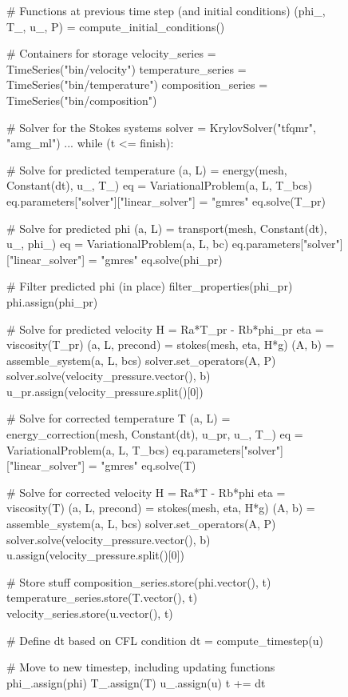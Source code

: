 \begin{figure}
  \begin{center}
    \begin{python}
# Functions at previous time step (and initial conditions)
(phi_, T_, u_, P) = compute_initial_conditions()

# Containers for storage
velocity_series = TimeSeries("bin/velocity")
temperature_series = TimeSeries("bin/temperature")
composition_series = TimeSeries("bin/composition")

# Solver for the Stokes systems
solver = KrylovSolver("tfqmr", "amg_ml")
...
while (t <= finish):

    # Solve for predicted temperature
    (a, L) = energy(mesh, Constant(dt), u_, T_)
    eq = VariationalProblem(a, L, T_bcs)
    eq.parameters["solver"]["linear_solver"] = "gmres"
    eq.solve(T_pr)

    # Solve for predicted phi
    (a, L) = transport(mesh, Constant(dt), u_, phi_)
    eq = VariationalProblem(a, L, bc)
    eq.parameters["solver"]["linear_solver"] = "gmres"
    eq.solve(phi_pr)

    # Filter predicted phi (in place)
    filter_properties(phi_pr)
    phi.assign(phi_pr)

    # Solve for predicted velocity
    H = Ra*T_pr - Rb*phi_pr
    eta = viscosity(T_pr)
    (a, L, precond) = stokes(mesh, eta, H*g)
    (A, b) = assemble_system(a, L, bcs)
    solver.set_operators(A, P)
    solver.solve(velocity_pressure.vector(), b)
    u_pr.assign(velocity_pressure.split()[0])

    # Solve for corrected temperature T
    (a, L) = energy_correction(mesh, Constant(dt), u_pr, u_, T_)
    eq = VariationalProblem(a, L, T_bcs)
    eq.parameters["solver"]["linear_solver"] = "gmres"
    eq.solve(T)

    # Solve for corrected velocity
    H = Ra*T - Rb*phi
    eta = viscosity(T)
    (a, L, precond) = stokes(mesh, eta, H*g)
    (A, b) = assemble_system(a, L, bcs)
    solver.set_operators(A, P)
    solver.solve(velocity_pressure.vector(), b)
    u.assign(velocity_pressure.split()[0])

    # Store stuff
    composition_series.store(phi.vector(), t)
    temperature_series.store(T.vector(), t)
    velocity_series.store(u.vector(), t)

    # Define dt based on CFL condition
    dt = compute_timestep(u)

    # Move to new timestep, including updating functions
    phi_.assign(phi)
    T_.assign(T)
    u_.assign(u)
    t += dt
    \end{python}
  \end{center}


\end{figure}
